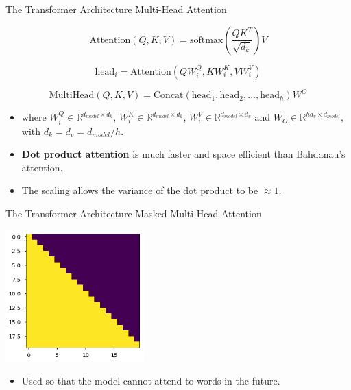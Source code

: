 \documentclass[aspectratio=169]{beamer}
\begin{document}
\begin{frame}{The Transformer Architecture}
\centering
Multi-Head Attention

$$
\mathrm{Attention}(Q, K, V) = \mathrm{softmax}\left( \frac{QK^T}{\sqrt{d_k}} \right)V
$$

$$
\mathrm{head}_i = \mathrm{Attention}\left(QW_i ^Q, KW_i ^K, VW_i ^V\right)
$$

$$
\mathrm{MultiHead}(Q, K, V) = \mathrm{Concat}(\mathrm{head}_1, \mathrm{head}_2, \dots, \mathrm{head}_h)W^O
$$

\begin{itemize}
	\item where $W_i ^Q \in \mathbb{R}^{d_{model} \times d_k}$, $W_i^K \in \mathbb{R}^{d_{model} \times d_k}$, $W_i ^V \in \mathbb{R}^{d_{model} \times d_v}$ and $W_O \in \mathbb{R}^{hd_v \times d_{model}}$, with $d_k = d_v = d_{model} / h$.
	\item \textbf{Dot product attention} is much faster and space efficient than Bahdanau's attention.
	\item The scaling allows the variance of the dot product to be $\approx 1$.
\end{itemize}

\end{frame}

\begin{frame}{The Transformer Architecture}
\centering
Masked Multi-Head Attention
\vspace{.5cm}

\includegraphics[width=0.4\textwidth]{figures/masked_multihead_attn}

\begin{itemize}
	\item Used so that the model cannot attend to words in the future.
\end{itemize}

\end{frame}
\end{document}
